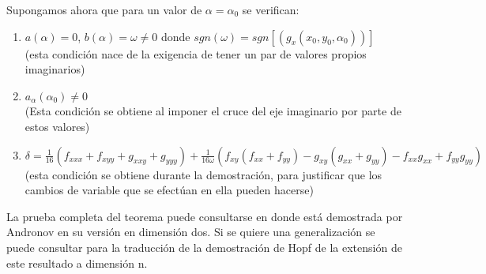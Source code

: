 \begin{enumerate}
\begin{theorem}
		Supongamos ahora que para un valor de $\alpha=\alpha_0$ se verifican:
		\begin{enumerate}
			\item $a(\alpha)=0$, $b(\alpha)=\omega\neq0$ donde $sgn(\omega)=sgn[(g_x(x_0,y_0,\alpha_0))]$\\(esta condición nace de la exigencia de tener un par de valores propios imaginarios)
			\item $a_\alpha(\alpha_0)\neq0$\\(Esta condición se obtiene al imponer el cruce del eje imaginario por parte de estos valores)
			\item $\delta=\frac{1}{16}(f_{xxx}+f_{xyy}+g_{xxy}+g_{yyy})+\frac{1}{16\omega}(f_{xy}(f_{xx}+f_{yy})-g_{xy}(g_{xx}+g_{yy})-f_{xx}g_{xx}+f_{yy}g_{yy})$\\(esta condición se obtiene durante la demostración, para justificar que los cambios de variable que se efectúan en ella pueden hacerse)
		\end{enumerate}
		\label{teoremahopf}
	\end{theorem}
	La prueba completa del teorema puede consultarse en \cite{andronof} donde está demostrada por Andronov en su versión en dimensión dos. Si se quiere una generalización se puede consultar\cite{hopfbif} para la traducción de la demostración de Hopf de la extensión de este resultado a dimensión n.
	
\end{enumerate}

